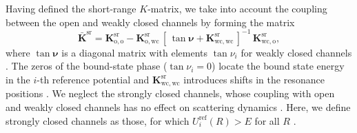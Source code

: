 \documentclass[reprint,amssymb,noeprint,twocolumn,longbibliography]{revtex4-2}
\begin{document}


Having defined the short-range $K$-matrix, we take into account the coupling between the open and weakly closed channels by forming the matrix
\begin{equation}
\bar{\bm{K}}^\text{sr}=\bm{K}_\mathrm{o,o}^\text{sr}-\bm{K}_\mathrm{o,wc}^\text{sr}\,[\,\tan{\bm{\nu}}+\bm{K}_\mathrm{wc,wc}^\text{sr} \,]^{-1}\,\bm{K}_\mathrm{wc,o}^\text{sr},
\label{eq:Ksr_exact}
\end{equation}
where $\tan{\bm{\nu}}$ is a diagonal matrix with elements $\tan \nu_i$ for weakly closed channels \cite{Mies_84,Mies_00,Croft_11}.
The zeros of the bound-state phase ($\tan \nu_i=0$) locate the bound state energy in the $i$-th reference potential and $\bm{K}_\mathrm{wc,wc}^\text{sr}$ introduces shifts in the resonance positions \cite{Mies_00}.
We neglect the strongly closed channels, whose coupling with open and weakly closed channels has no effect on scattering dynamics \cite{Croft_11,Croft_12,SM}. 
Here, we define strongly closed channels as those, for which $U_i^\text{ref}(R)>E$ for all $R$ \cite{SM}.
\end{document}
